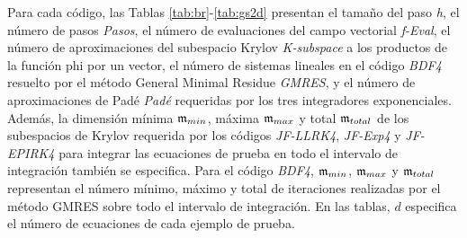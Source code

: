 Para cada código, las Tablas \ref{tab:br}-\ref{tab:gs2d} presentan el tamaño del paso \textit{h}, el número de pasos \textit{Pasos}, el número de evaluaciones del campo vectorial \textit{f-Eval}, el número de aproximaciones del subespacio Krylov \textit{K-subspace} a los productos de la función phi por un vector, el número de sistemas lineales en el código \textit{BDF4} resuelto por el método General Minimal Residue \textit {GMRES}, y el número de aproximaciones de Padé \textit{Padé} requeridas por los tres integradores exponenciales. Además, la dimensión mínima $\mathfrak{m}_{min}$, máxima $\mathfrak{m}_{max}$ y total $\mathfrak{m}_{total}$ de los subespacios de Krylov requerida por los códigos \textit{JF-LLRK4}, \textit{JF-Exp4} y \textit{JF-EPIRK4} para integrar las ecuaciones de prueba en todo el intervalo de integración también se especifica. Para el código \emph{BDF4}, $\mathfrak{m}_{min}$, $\mathfrak{m}_{max}$ y $\mathfrak{m}_{total}$ representan el número mínimo, máximo y total de iteraciones realizadas por el método GMRES sobre todo el intervalo de integración. En las tablas, $d$ especifica el número de ecuaciones de cada ejemplo de prueba.

